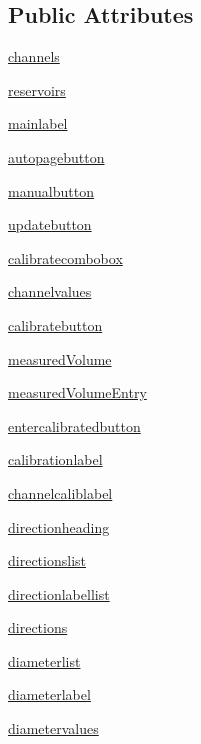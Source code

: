 \subsection*{Public Attributes}
\begin{DoxyCompactItemize}
\item 
\mbox{\hyperlink{classgui_1_1_settings_page_a1c5e90e8faf482bd7889022f6e071a55}{channels}}
\item 
\mbox{\hyperlink{classgui_1_1_settings_page_a6540b0cddb528016810caa40902d23eb}{reservoirs}}
\item 
\mbox{\hyperlink{classgui_1_1_settings_page_a3e3eb465cc187fc73c0a13d057dc973e}{mainlabel}}
\item 
\mbox{\hyperlink{classgui_1_1_settings_page_a244f69ad9a1606d1c5d7cd29970eb892}{autopagebutton}}
\item 
\mbox{\hyperlink{classgui_1_1_settings_page_ae07663134fd244a2c1609ee85aaec03b}{manualbutton}}
\item 
\mbox{\hyperlink{classgui_1_1_settings_page_a8b32a4df0cd42d070635c54eab948859}{updatebutton}}
\item 
\mbox{\hyperlink{classgui_1_1_settings_page_afea11f565c6d495382334c32113b7d4b}{calibratecombobox}}
\item 
\mbox{\hyperlink{classgui_1_1_settings_page_a4adda89ac2b19fe9635db0ded6263254}{channelvalues}}
\item 
\mbox{\hyperlink{classgui_1_1_settings_page_a4aab78aef30f6259c8ac7124ffaaab63}{calibratebutton}}
\item 
\mbox{\hyperlink{classgui_1_1_settings_page_a4231170288c7640286577a8a6654f10b}{measured\+Volume}}
\item 
\mbox{\hyperlink{classgui_1_1_settings_page_aaa398afd46dc035efcb7a1a6063a4bc2}{measured\+Volume\+Entry}}
\item 
\mbox{\hyperlink{classgui_1_1_settings_page_ab49b535727d53dfafd5b903a335be1f6}{entercalibratedbutton}}
\item 
\mbox{\hyperlink{classgui_1_1_settings_page_a94bb3b68ce6a5bd9e55f0b0309f77b27}{calibrationlabel}}
\item 
\mbox{\hyperlink{classgui_1_1_settings_page_ac1bea32b8364a1d2acae35c6685b2ab9}{channelcaliblabel}}
\item 
\mbox{\hyperlink{classgui_1_1_settings_page_a543df99e680b7b2c6e788ae1878bbe8e}{directionheading}}
\item 
\mbox{\hyperlink{classgui_1_1_settings_page_a958bc2d59118435d66dd0401ae046c59}{directionslist}}
\item 
\mbox{\hyperlink{classgui_1_1_settings_page_a21cfd2eff92a22ad836fbc7d691fabb7}{directionlabellist}}
\item 
\mbox{\hyperlink{classgui_1_1_settings_page_abd18115319e94ab60ef4d26e0ca5ce33}{directions}}
\item 
\mbox{\hyperlink{classgui_1_1_settings_page_a0d54112cb3619e3148968ec853a00f19}{diameterlist}}
\item 
\mbox{\hyperlink{classgui_1_1_settings_page_a29329f4afd2779beb192868416c05dd5}{diameterlabel}}
\item 
\mbox{\hyperlink{classgui_1_1_settings_page_a6c8d831dbf1d4b98fdea0927eadb7b4b}{diametervalues}}
\end{DoxyCompactItemize}



